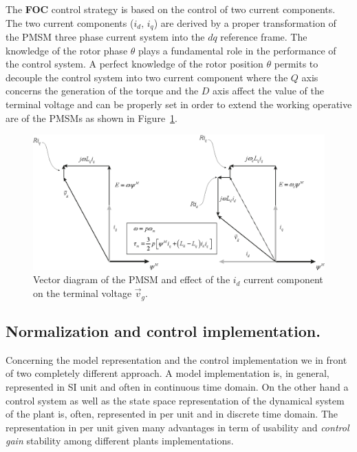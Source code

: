 \documentclass[11pt,a4paper]{article}
\numberwithin{equation}{section}
\theoremstyle{it}
\theoremstyle{definition}
\begin{document}
\begin{onehalfspace}
The \textbf{FOC} control strategy is based on the control of two current components. The two current components ($i_d,\,i_q$) are derived by a proper transformation of the PMSM three phase current system into the $dq$ reference frame. The knowledge of the rotor phase $\theta$ plays a fundamental role in the performance of the control system. A perfect knowledge of the rotor position $\theta$ permits to decouple the control system into two current component where the $Q$ axis concerns the generation of the torque and the $D$ axis affect the value of the terminal voltage and can be properly set in order to extend the working operative are of the PMSMs as shown in Figure~\ref{vector_plane_1}.
\begin{figure}[H]
	\centering
	\includegraphics[width = 400pt, keepaspectratio]{figures/pmsm/pmsm_vector_graph_1.eps}
	\captionsetup{width=0.5\textwidth, font=small}
	\caption{Vector diagram of the PMSM and effect of the $i_d$ current component on the terminal voltage $\vec{v}_g$.}
	\label{vector_plane_1}
\end{figure}
\subsection{Normalization and control implementation.}
Concerning the model representation and the control implementation we in front of two completely different approach. A model implementation is, in general, represented in SI unit and often in continuous time domain. On the other hand a control system as well as the state space representation of the dynamical system of the plant is, often, represented in per unit and in discrete time domain. The representation in per unit given many advantages in term of usability and \textit{control gain} stability among different plants implementations.


\end{onehalfspace}
\end{document}
